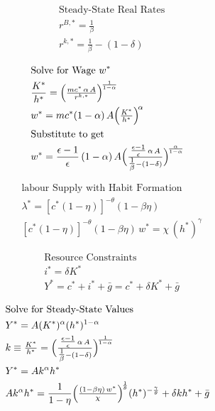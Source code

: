 \documentclass[11pt,preprint]{elsarticle}
\numberwithin{equation}{section}
\numberwithin{figure}{section}
\numberwithin{table}{section}
\begin{document}
\begin{align*}
& \text{Steady-State Real Rates} \\
& r^{B,*} = \frac{1}{\beta} \\
& r^{k,*} = \frac{1}{\beta} - (1 - \delta)
\end{align*}

\begin{align*}
& \text{Solve for Wage } w^* \\
& \frac{K^*}{h^*}
  = \Bigl(\tfrac{mc^*\,\alpha\,A}{r^{k,*}}\Bigr)^{\!\frac{1}{1-\alpha}} \\
& w^* = mc^*(1-\alpha)\,A \Bigl(\tfrac{K^*}{h^*}\Bigr)^{\!\alpha} \\
& \text{Substitute to get} \\
& w^* = \frac{\epsilon-1}{\epsilon}\,(1-\alpha)\,A
         \Bigl(\tfrac{\tfrac{\epsilon-1}{\epsilon}\,\alpha\,A}
                     {\tfrac{1}{\beta} - (1-\delta)}\Bigr)^{\!\frac{\alpha}{1-\alpha}}
\end{align*}

\begin{align*}
& \text{labour Supply with Habit Formation} \\
& \lambda^* = [c^*(1-\eta)]^{-\theta}(1 - \beta\eta) \\
& [c^*(1-\eta)]^{-\theta}(1 - \beta\eta)\,w^* = \chi\,(h^*)^\gamma
\end{align*}

\begin{align*}
& \text{Resource Constraints} \\
& i^* = \delta K^* \\
& Y^* = c^* + i^* + \bar{g} = c^* + \delta K^* + \bar{g}
\end{align*}

\begin{align*}
& \text{Solve for Steady-State Values} \\
& Y^* = A (K^*)^\alpha (h^*)^{1-\alpha} \\
& k \equiv \tfrac{K^*}{h^*}
  = \Bigl(\tfrac{\tfrac{\epsilon-1}{\epsilon}\,\alpha\,A}
               {\tfrac{1}{\beta} - (1-\delta)}\Bigr)^{\!\frac{1}{1-\alpha}} \\
& Y^* = A k^\alpha h^* \\
& A k^\alpha h^* = \frac{1}{1-\eta}
                   \Bigl(\tfrac{(1-\beta\eta)\,w^*}{\chi}\Bigr)^{\!\frac{1}{\theta}}
                   (h^*)^{-\frac{\gamma}{\theta}}
                 + \delta k h^* + \bar{g}
\end{align*}
\end{document}
